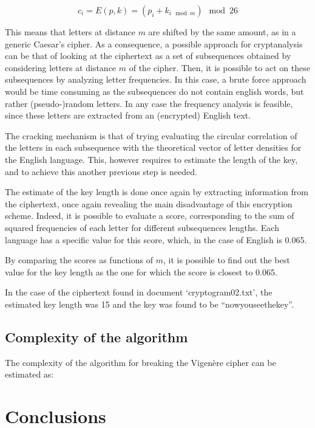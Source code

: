 \documentclass[12pt]{article}
\begin{document}
\begin{equation*}
  c_i = E(p,k) = (p_i + k_{i\mod{m}})\mod{26}
\end{equation*}

This means that letters at distance $m$ are shifted by the same amount, as in a generic Caesar's cipher.
As a consequence, a possible approach for cryptanalysis can be that of looking at the ciphertext as a set of subsequences obtained by considering letters at distance $m$ of the cipher. 
Then, it is possible to act on these subsequences by analyzing letter frequencies. In this case, a brute force approach would be time consuming as the subsequences do not contain english words, but rather (pseudo-)random letters. 
In any case the frequency analysis is feasible, since these letters are extracted from an (encrypted) English text.

The cracking mechanism is that of trying evaluating the circular correlation of the letters in each subsequence with the theoretical vector of letter densities for the English language.
This, however requires to estimate the length of the key, and to achieve this another previous step is needed.

The estimate of the key length is done once again by extracting information from the ciphertext, once again revealing the main disadvantage of this encryption scheme.
Indeed, it is possible to evaluate a score, corresponding to the sum of squared frequencies of each letter for different subsequences lengths.
Each language has a specific value for this score, which, in the case of English is 0.065.

By comparing the scores as functions of $m$, it is possible to find out the best value for the key length as the one for which the score is closest to 0.065.

In the case of the ciphertext found in document `cryptogram02.txt', the estimated key length was 15 and the key was found to be ``nowyouseethekey''.

\subsection{Complexity of the algorithm}

The complexity of the algorithm for breaking the Vigenère cipher can be estimated as:

%


\section{Conclusions}


\pagebreak
\end{document}
